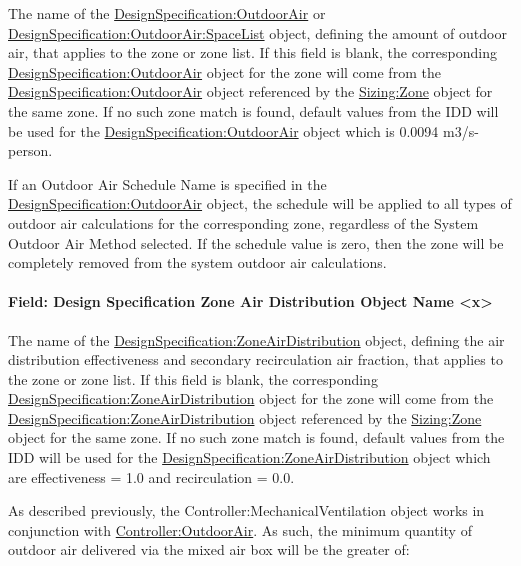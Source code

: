 The name of the \hyperref[designspecificationoutdoorair]{DesignSpecification:OutdoorAir} or \hyperref[designspecificationoutdoorairspacelist]{DesignSpecification:OutdoorAir:SpaceList} object, defining the amount of outdoor air, that applies to the zone or zone list. If this field is blank, the corresponding \hyperref[designspecificationoutdoorair]{DesignSpecification:OutdoorAir} object for the zone will come from the \hyperref[designspecificationoutdoorair]{DesignSpecification:OutdoorAir} object referenced by the \hyperref[sizingzone]{Sizing:Zone} object for the same zone. If no such zone match is found, default values from the IDD will be used for the \hyperref[designspecificationoutdoorair]{DesignSpecification:OutdoorAir} object which is 0.0094 m3/s-person.

If an Outdoor Air Schedule Name is specified in the \hyperref[designspecificationoutdoorair]{DesignSpecification:OutdoorAir} object, the schedule will be applied to all types of outdoor air calculations for the corresponding zone, regardless of the System Outdoor Air Method selected. If the schedule value is zero, then the zone will be completely removed from the system outdoor air calculations.

\paragraph{Field: Design Specification Zone Air Distribution Object Name \textless{}x\textgreater{}}\label{field-design-specification-zone-air-distribution-object-name-x}

The name of the \hyperref[designspecificationzoneairdistribution]{DesignSpecification:ZoneAirDistribution} object, defining the air distribution effectiveness and secondary recirculation air fraction, that applies to the zone or zone list. If this field is blank, the corresponding \hyperref[designspecificationzoneairdistribution]{DesignSpecification:ZoneAirDistribution} object for the zone will come from the \hyperref[designspecificationzoneairdistribution]{DesignSpecification:ZoneAirDistribution} object referenced by the \hyperref[sizingzone]{Sizing:Zone} object for the same zone. If no such zone match is found, default values from the IDD will be used for the \hyperref[designspecificationzoneairdistribution]{DesignSpecification:ZoneAirDistribution} object which are effectiveness = 1.0 and recirculation = 0.0.

As described previously, the Controller:MechanicalVentilation object works in conjunction with \hyperref[controlleroutdoorair]{Controller:OutdoorAir}. As such, the minimum quantity of outdoor air delivered via the mixed air box will be the greater of:

